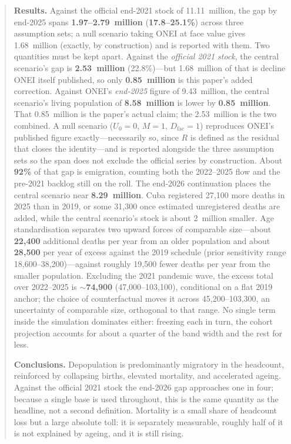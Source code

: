 \documentclass[11pt,a4paper]{article}
\begin{document}
\begin{abstract}
\textbf{Results.}
Against the official end-2021 stock of 11.11~million, the gap by end-2025 spans \textbf{1.97--2.79~million} (\textbf{17.8--25.1\%}) across three assumption sets; a null scenario taking ONEI at face value gives 1.68~million (exactly, by construction) and is reported with them.
Two quantities must be kept apart.
Against the \emph{official 2021 stock}, the central scenario's gap is \textbf{2.53~million} (22.8\%)---but 1.68~million of that is decline ONEI itself published, so only \textbf{0.85~million} is this paper's added correction.
Against ONEI's \emph{end-2025} figure of 9.43~million, the central scenario's living population of \textbf{8.58~million} is lower by \textbf{0.85~million}.
That 0.85~million is the paper's actual claim; the 2.53~million is the two combined.
A null scenario ($U_0{=}0$, $M{=}1$, $D_{\mathrm{fac}}{=}1$) reproduces ONEI's published figure exactly---necessarily so, since $R$ is defined as the residual that closes the identity---and is reported alongside the three assumption sets so the span does not exclude the official series by construction.
About \textbf{92\%} of that gap is emigration, counting both the 2022--2025 flow and the pre-2021 backlog still on the roll.
The end-2026 continuation places the central scenario near \textbf{8.29~million}.
Cuba registered 27{,}100 more deaths in 2025 than in 2019, or some 31{,}300 once estimated unregistered deaths are added, while the central scenario's stock is about 2~million smaller.
Age standardisation separates two upward forces of comparable size---about \textbf{22{,}400} additional deaths per year from an older population and about \textbf{28{,}500} per year of excess against the 2019 schedule (prior sensitivity range 18{,}600--38{,}200)---against roughly 19{,}500 fewer deaths per year from the smaller population.
Excluding the 2021 pandemic wave, the excess total over 2022--2025 is $\sim$\textbf{74{,}900} (47{,}000--103{,}100), conditional on a flat 2019 anchor; the choice of counterfactual moves it across 45{,}200--103{,}300, an uncertainty of comparable size, orthogonal to that range. No single term inside the simulation dominates either: freezing each in turn, the cohort projection accounts for about a quarter of the band width and the rest for less.

\textbf{Conclusions.}
Depopulation is predominantly migratory in the headcount, reinforced by collapsing births, elevated mortality, and accelerated ageing.
Against the official 2021 stock the end-2026 gap approaches one in four; because a single base is used throughout, this is the same quantity as the headline, not a second definition.
Mortality is a small share of headcount loss but a large absolute toll: it is separately measurable, roughly half of it is not explained by ageing, and it is still rising.
\end{abstract}
\end{document}
